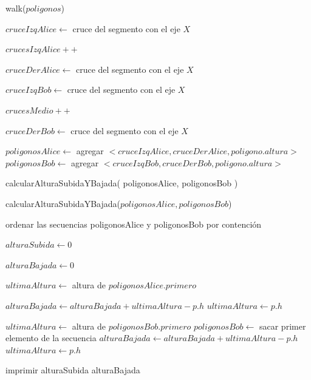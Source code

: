 \begin{algorithm}[H]
\linesnumbered
\caption{walk($poligonos$)}
\vspace{0.4cm}
 {
     {
         {
             {
                $cruceIzqAlice \gets$ cruce del segmento con el eje $X$
                
                $crucesIzqAlice++$
            }
             {
                $cruceDerAlice \gets$ cruce del segmento con el eje $X$
                
                $cruceIzqBob \gets$ cruce del segmento con el eje $X$
                
                $crucesMedio++$
            }
             {
                $cruceDerBob \gets$ cruce del segmento con el eje $X$
            }
        }
    }
    
     {
        $poligonosAlice \gets$ agregar $<cruceIzqAlice, cruceDerAlice, poligono.altura>$
    }
     {
        $poligonosBob \gets$ agregar $<cruceIzqBob, cruceDerBob, poligono.altura>$
    }
}

calcularAlturaSubidaYBajada( poligonosAlice, poligonosBob )
\end{algorithm}

\begin{algorithm}[H]
\linesnumbered
\caption{calcularAlturaSubidaYBajada($poligonosAlice, poligonosBob$)}
\vspace{0.4cm}

ordenar las secuencias poligonosAlice y poligonosBob por contención

$alturaSubida \gets 0$

$alturaBajada \gets 0$

 {
    $ultimaAltura \gets$ altura de $poligonosAlice.primero$
    
     {
         {
            $alturaBajada \gets alturaBajada + ultimaAltura - p.h$
        }
        $ultimaAltura \gets p.h$
    }
}

 {
     {
        $ultimaAltura \gets$ altura de $poligonosBob.primero$
        $poligonosBob \gets$ sacar primer elemento de la secuencia
    }
     {
         {
            $alturaBajada \gets alturaBajada + ultimaAltura - p.h$
        }
        $ultimaAltura \gets p.h$
    }
}

imprimir alturaSubida alturaBajada
\end{algorithm}

